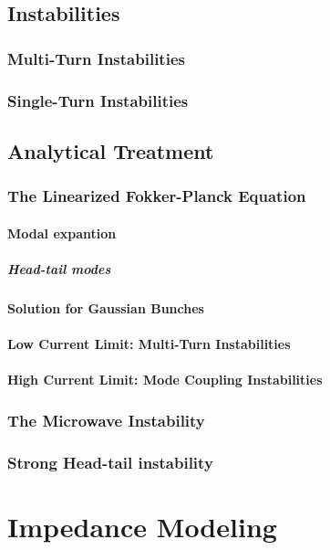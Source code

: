 \section{Instabilities}
\subsection{Multi-Turn Instabilities}
\subsection{Single-Turn Instabilities}
\section{Analytical Treatment}
\subsection{The Linearized Fokker-Planck Equation}
\subsubsection{Modal expantion}
\paragraph{Head-tail modes}
\subsubsection{Solution for Gaussian Bunches}
\subsubsection{Low Current Limit: Multi-Turn Instabilities}
\subsubsection{High Current Limit: Mode Coupling Instabilities}
\subsection{The Microwave Instability}
\subsection{Strong Head-tail instability}


\chapter{Impedance Modeling}\label{cap:impedance_modeling}

